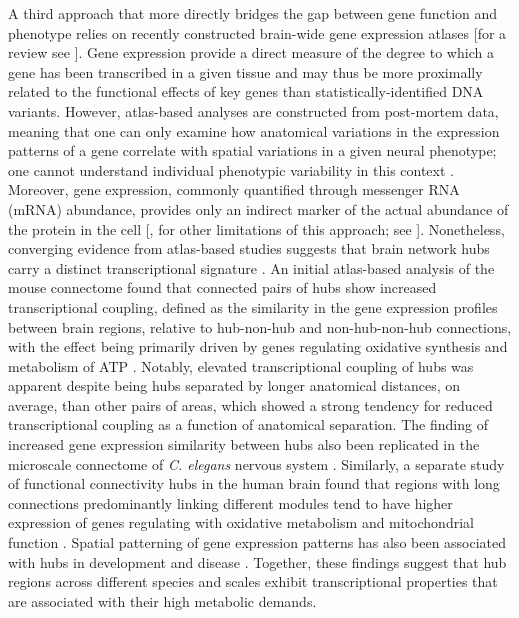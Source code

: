A third approach that more directly bridges the gap between gene function and phenotype relies on recently constructed brain-wide gene expression atlases \citep{Hawrylycz2012} [for a review see \citep{Keil2018}]. Gene expression provide a direct measure of the degree to which a gene has been transcribed in a given tissue and may thus be more proximally related to the functional effects of key genes than statistically-identified DNA variants. However, atlas-based analyses are constructed from post-mortem data, meaning that one can only examine how anatomical variations in the expression patterns of a gene correlate with spatial variations in a given neural phenotype; one cannot understand individual phenotypic variability in this context \citep{Fornito2019}. Moreover, gene expression, commonly quantified through messenger RNA (mRNA) abundance, provides only an indirect marker of the actual abundance of the protein in the cell [\citep{Futcher1999,Greenbaum2003,Gygi1999}, for other limitations of this approach; see \citep{Fornito2019}]. Nonetheless, converging evidence from atlas-based studies suggests that brain network hubs carry a distinct transcriptional signature \citep{Arnatkeviciute2018,Fulcher2016,Rubinov2015c,Vertes2016b}. An initial atlas-based analysis of the mouse connectome found that connected pairs of hubs show increased transcriptional coupling, defined as the similarity in the gene expression profiles between brain regions, relative to hub-non-hub and non-hub-non-hub connections, with the effect being primarily driven by genes regulating oxidative synthesis and metabolism of ATP \citep{Fulcher2016}. Notably, elevated transcriptional coupling of hubs was apparent despite being hubs separated by longer anatomical distances, on average, than other pairs of areas, which showed a strong tendency for reduced transcriptional coupling as a function of anatomical separation. The finding of increased gene expression similarity between hubs also been replicated in the microscale connectome of \textit{C. elegans} nervous system \citep{Arnatkeviciute2018}. Similarly, a separate study of functional connectivity hubs in the human brain found that regions with long connections predominantly linking different modules tend to have higher expression of genes regulating with oxidative metabolism and mitochondrial function \citep{Vertes2016b}. Spatial patterning of gene expression patterns has also been associated with hubs in development \citep{Whitaker2016a} and disease \citep{Rittman2016}. Together, these findings suggest that hub regions across different species and scales exhibit transcriptional properties that are associated with their high metabolic demands. 

